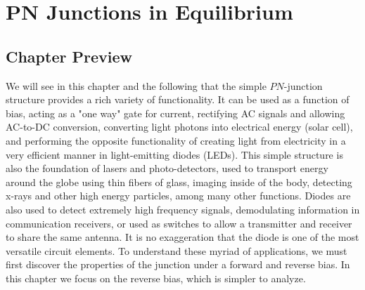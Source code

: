 \chapter{PN Junctions in Equilibrium}
\label{ch:ch05_pn_junc}
\graphicspath{{./figures/figs_ch05_pn_junc/}}
\section{Chapter Preview}
We will see in this chapter and the following that the simple $PN$-junction structure provides a rich variety of functionality.  It can be used as a function of bias, acting as a "one way" gate for current, rectifying AC signals and allowing AC-to-DC conversion, converting light photons into electrical energy (solar cell), and performing the opposite functionality of creating light from electricity in a very efficient manner in light-emitting diodes (LEDs).  This simple structure is also the foundation of lasers and photo-detectors, used to transport energy around the globe using thin fibers of glass, imaging inside of the body, detecting x-rays and other high energy particles, among many other functions.  Diodes are also used to detect extremely high frequency signals, demodulating information in communication receivers, or used as switches to allow a transmitter and receiver to share the same antenna.  It is no exaggeration that the diode is one of the most versatile circuit elements.  To understand these myriad of applications, we must first discover the properties of the junction under a forward and reverse bias.  In this chapter we focus on the reverse bias, which is simpler to analyze.


